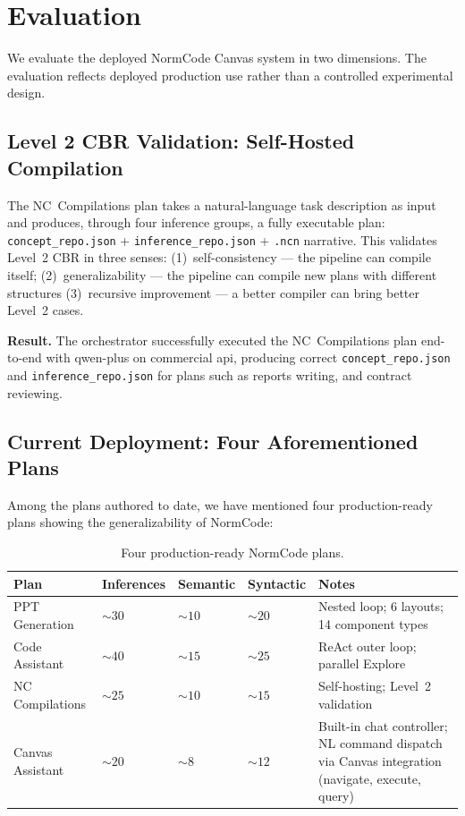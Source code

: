 \section{Evaluation}
\label{sec:evaluation}

We evaluate the deployed NormCode Canvas system in two dimensions. The evaluation
reflects deployed production use rather than a controlled experimental design.

\subsection{Level 2 CBR Validation: Self-Hosted Compilation}

The NC~Compilations plan takes a natural-language task description as input and
produces, through four inference groups, a fully executable plan:
\texttt{concept\_repo.json} + \texttt{inference\_repo.json} + \texttt{.ncn} narrative.
This validates Level~2 CBR in three senses: (1)~self-consistency --- the pipeline can
compile itself; (2)~generalizability --- the pipeline can compile new plans with different structures
(3)~recursive improvement --- a better compiler can bring better Level~2 cases.

\textbf{Result.} The orchestrator successfully executed the NC~Compilations plan
end-to-end with qwen-plus on commercial api, producing correct \texttt{concept\_repo.json} and
\texttt{inference\_repo.json} for plans such as reports writing, and contract reviewing. 

\subsection{Current Deployment: Four Aforementioned Plans}

Among the plans authored to date, we have mentioned four production-ready plans showing the
generalizability of NormCode:

\begin{table}[t]
\centering
\caption{Four production-ready NormCode plans.}
\label{tab:plans}
\begin{tabular}{@{}p{3.0cm}p{1.6cm}p{1.6cm}p{1.6cm}p{3.4cm}@{}}
\toprule
\textbf{Plan} & \textbf{Inferences} & \textbf{Semantic} & \textbf{Syntactic} & \textbf{Notes} \\
\midrule
PPT Generation  & ${\sim}30$ & ${\sim}10$ & ${\sim}20$ & Nested loop; 6 layouts; 14 component types \\
Code Assistant  & ${\sim}40$ & ${\sim}15$ & ${\sim}25$ & ReAct outer loop; parallel Explore \\
NC Compilations & ${\sim}25$ & ${\sim}10$ & ${\sim}15$ & Self-hosting; Level~2 validation \\
Canvas Assistant & ${\sim}20$ & ${\sim}8$  & ${\sim}12$ & Built-in chat controller; NL command dispatch via Canvas integration (navigate, execute, query) \\
\bottomrule
\end{tabular}
\end{table}

